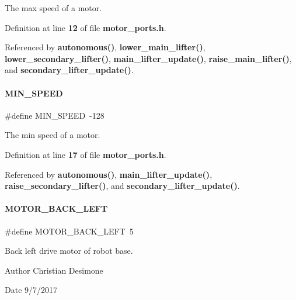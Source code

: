 The max speed of a motor. 



Definition at line \textbf{ 12} of file \textbf{ motor\+\_\+ports.\+h}.



Referenced by \textbf{ autonomous()}, \textbf{ lower\+\_\+main\+\_\+lifter()}, \textbf{ lower\+\_\+secondary\+\_\+lifter()}, \textbf{ main\+\_\+lifter\+\_\+update()}, \textbf{ raise\+\_\+main\+\_\+lifter()}, and \textbf{ secondary\+\_\+lifter\+\_\+update()}.

\mbox{\label{a00050_ad5f5efaa5cb771bd06da4bfe6046809e}} 
\paragraph{M\+I\+N\+\_\+\+S\+P\+E\+ED}
{\footnotesize\ttfamily \#define M\+I\+N\+\_\+\+S\+P\+E\+ED~-\/128}



The min speed of a motor. 



Definition at line \textbf{ 17} of file \textbf{ motor\+\_\+ports.\+h}.



Referenced by \textbf{ autonomous()}, \textbf{ main\+\_\+lifter\+\_\+update()}, \textbf{ raise\+\_\+secondary\+\_\+lifter()}, and \textbf{ secondary\+\_\+lifter\+\_\+update()}.

\mbox{\label{a00050_a36e9fda07b5cd4408170fe907b75a8b7}} 
\paragraph{M\+O\+T\+O\+R\+\_\+\+B\+A\+C\+K\+\_\+\+L\+E\+FT}
{\footnotesize\ttfamily \#define M\+O\+T\+O\+R\+\_\+\+B\+A\+C\+K\+\_\+\+L\+E\+FT~5}



Back left drive motor of robot base. 

\begin{DoxyAuthor}{Author}
Christian Desimone 
\end{DoxyAuthor}
\begin{DoxyDate}{Date}
9/7/2017 
\end{DoxyDate}


